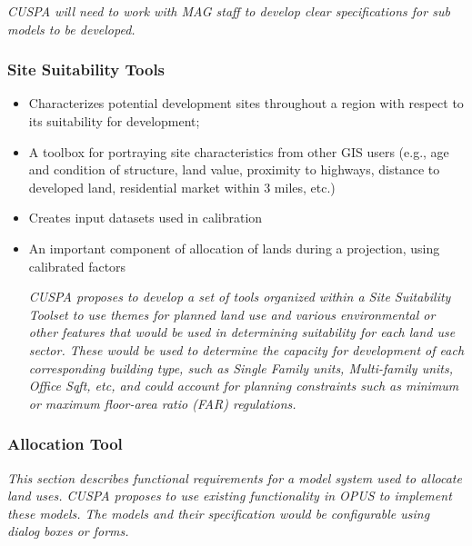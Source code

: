\emph{CUSPA will need to work with MAG staff to develop clear specifications for sub models to be developed.}


\subsubsection{Site Suitability Tools}
\begin{itemize}
\item Characterizes potential development sites throughout a region with respect to its suitability for development;
\item A toolbox for portraying site characteristics from other GIS users (e.g., age and condition of structure, land value, proximity to highways, distance to developed land, residential market within 3 miles, etc.)
\item Creates input datasets used in calibration
\item An important component of allocation of lands during a projection, using calibrated factors

\emph{CUSPA proposes to develop a set of tools organized within a Site Suitability Toolset to use themes for planned land use and various environmental or other features that would be used in determining suitability for each land use sector.  These would be used to determine the capacity for development of each corresponding building type, such as Single Family units, Multi-family units, Office Sqft, etc, and could account for planning constraints such as minimum or maximum floor-area ratio (FAR) regulations.}

\end{itemize}

\subsubsection{Allocation Tool}

\emph{This section describes functional requirements for a model system used to allocate land uses.  CUSPA proposes to use existing functionality in OPUS to implement these models.  The models and their specification would be configurable using dialog boxes or forms.}

